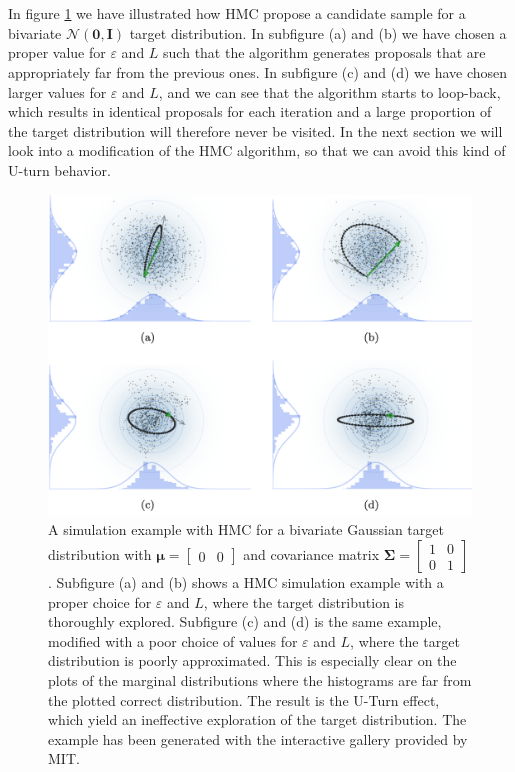 \\
\\
In figure \ref{fig:HMC_Example} we have illustrated how HMC propose a candidate sample for a bivariate $\mathcal{N}\left(\boldsymbol{0},\boldsymbol{I}\right)$ target distribution. In subfigure (a) and (b) we have chosen a proper value for $\varepsilon$ and $L$ such that the algorithm generates proposals that are appropriately far from the previous ones. In subfigure (c) and (d) we have chosen larger values for $\varepsilon$ and $L$, and we can see that the algorithm starts to loop-back, which results in identical proposals for each iteration and a large proportion of the target distribution will therefore never be visited. In the next section we will look into a modification of the HMC algorithm, so that we can avoid this kind of U-turn behavior.  

\begin{figure}[h!]
    \centering
    \includegraphics[width=\textwidth]{pics/HMC_Example.png}
    \caption{A simulation example with HMC for a bivariate Gaussian target distribution with $\boldsymbol{\mu}= \begin{bmatrix}
            0 & 0
            \end{bmatrix}$ and covariance matrix
            $\boldsymbol{\Sigma}= 
            \begin{bmatrix}
                1 & 0\\
                0 & 1   
            \end{bmatrix}$. Subfigure (a) and (b) shows a HMC simulation example with a proper choice for $\varepsilon$ and $L$, where the target distribution is thoroughly explored. Subfigure (c) and (d) is the same example, modified with a poor choice of values for $\varepsilon$ and $L$, where the target distribution is poorly approximated. This is especially clear on the plots of the marginal distributions where the histograms are far from the plotted correct distribution. The result is the U-Turn effect, which yield an ineffective exploration of the target distribution. The example has been generated with the interactive gallery provided by \cite{feng} \textcopyright MIT.}
    \label{fig:HMC_Example}
\end{figure}

